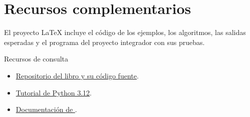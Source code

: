 \chapter{Recursos complementarios}

El proyecto LaTeX incluye el código de los ejemplos, los algoritmos, las salidas esperadas y el programa del proyecto integrador con sus pruebas.



Recursos de consulta\par\begin{itemize}
\item \href{https://github.com/velnae/libro-latex}{Repositorio del libro y su código fuente}.
\item \href{https://docs.python.org/es/3.12/tutorial/}{Tutorial de Python 3.12}.
\item \href{https://docs.python.org/es/3.12/library/unittest.html}{Documentación de }.
\end{itemize}
